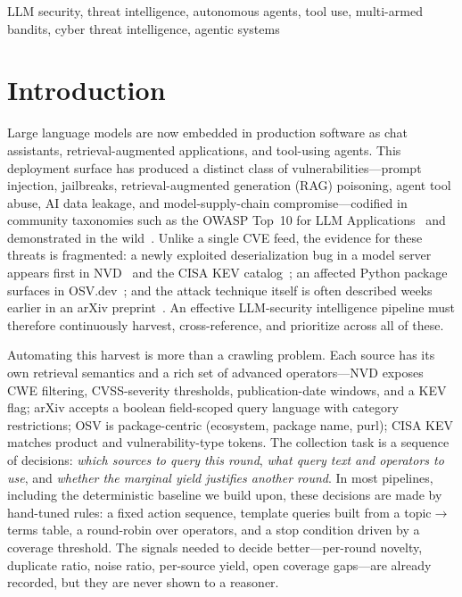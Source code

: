 \documentclass[conference]{IEEEtran}
\begin{document}
\begin{abstract}
hindsight-optimal round on all nine goals (versus a mean one-fifth-round overshoot for the baseline), at $97.7\%$ live structured-decision reliability. We argue this coverage--efficiency trade-off---made explicitly tunable by the coverage gate---is the honest characterization of when an agentic collector earns its cost.
\end{abstract}

\begin{IEEEkeywords}
LLM security, threat intelligence, autonomous agents, tool use, multi-armed bandits, cyber threat intelligence, agentic systems
\end{IEEEkeywords}

\section{Introduction}

Large language models are now embedded in production software as chat assistants, retrieval-augmented applications, and tool-using agents. This deployment surface has produced a distinct class of vulnerabilities---prompt injection, jailbreaks, retrieval-augmented generation (RAG) poisoning, agent tool abuse, AI data leakage, and model-supply-chain compromise---codified in community taxonomies such as the OWASP Top~10 for LLM Applications~\cite{owasp2025llmtop10} and demonstrated in the wild~\cite{greshake2023injection}. Unlike a single CVE feed, the evidence for these threats is fragmented: a newly exploited deserialization bug in a model server appears first in NVD~\cite{nvd} and the CISA KEV catalog~\cite{cisakev}; an affected Python package surfaces in OSV.dev~\cite{osv}; and the attack technique itself is often described weeks earlier in an arXiv preprint~\cite{arxivapi}. An effective LLM-security intelligence pipeline must therefore continuously harvest, cross-reference, and prioritize across all of these.

Automating this harvest is more than a crawling problem. Each source has its own retrieval semantics and a rich set of advanced operators---NVD exposes CWE filtering, CVSS-severity thresholds, publication-date windows, and a KEV flag; arXiv accepts a boolean field-scoped query language with category restrictions; OSV is package-centric (ecosystem, package name, purl); CISA KEV matches product and vulnerability-type tokens. The collection task is a sequence of decisions: \emph{which sources to query this round}, \emph{what query text and operators to use}, and \emph{whether the marginal yield justifies another round}. In most pipelines, including the deterministic baseline we build upon, these decisions are made by hand-tuned rules: a fixed action sequence, template queries built from a topic$\rightarrow$terms table, a round-robin over operators, and a stop condition driven by a coverage threshold. The signals needed to decide better---per-round novelty, duplicate ratio, noise ratio, per-source yield, open coverage gaps---are already recorded, but they are never shown to a reasoner.
\end{document}
